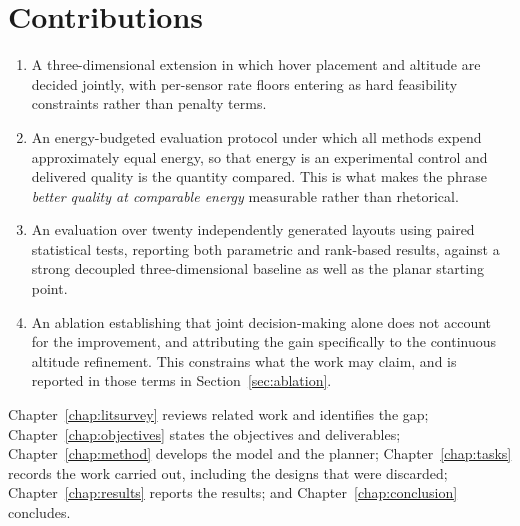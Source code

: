 \section{Contributions}

\begin{enumerate}
\item A three-dimensional extension in which hover placement and altitude are decided jointly, with per-sensor rate floors entering as hard feasibility constraints rather than penalty terms.

\item An energy-budgeted evaluation protocol under which all methods expend approximately equal energy, so that energy is an experimental control and delivered quality is the quantity compared. This is what makes the phrase \emph{better quality at comparable energy} measurable rather than rhetorical.

\item An evaluation over twenty independently generated layouts using paired statistical tests, reporting both parametric and rank-based results, against a strong decoupled three-dimensional baseline as well as the planar starting point.

\item An ablation establishing that joint decision-making alone does not account for the improvement, and attributing the gain specifically to the continuous altitude refinement. This constrains what the work may claim, and is reported in those terms in Section~\ref{sec:ablation}.
\end{enumerate}

\noindent Chapter~\ref{chap:litsurvey} reviews related work and identifies the gap; Chapter~\ref{chap:objectives} states the objectives and deliverables; Chapter~\ref{chap:method} develops the model and the planner; Chapter~\ref{chap:tasks} records the work carried out, including the designs that were discarded; Chapter~\ref{chap:results} reports the results; and Chapter~\ref{chap:conclusion} concludes.
